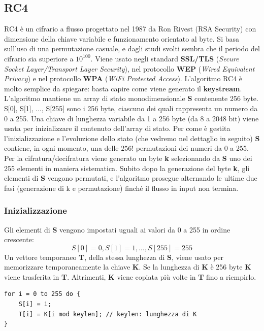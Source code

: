\subsection{RC4}
RC4 è un cifrario a flusso progettato nel 1987 da Ron Rivest (RSA Security) con dimensione della chiave variabile e funzionamento orientato al byte. Si basa sull'uso di una permutazione casuale, e dagli studi svolti sembra che il periodo del cifrario sia superiore a $10^{100}$. Viene usato negli standard \textbf{SSL/TLS} (\textit{Secure Socket Layer/Transport Layer Security}), nel protocollo \textbf{WEP} (\textit{Wired Equivalent Privacy}) e nel protocollo \textbf{WPA} (\textit{WiFi Protected Access}). L'algoritmo RC4 è molto semplice da spiegare: basta capire come viene generato il
\textbf{keystream}. \\

L'algoritmo mantiene un array di stato monodimensionale \textbf{S} contenente 256 byte. S[0], S[1], ..., S[255] sono i 256 byte, ciascuno dei quali rappresenta un numero da 0 a 255. Una chiave di lunghezza variabile da 1 a 256 byte (da 8 a 2048 bit) viene usata per inizializzare il contenuto dell'array di stato. Per come è gestita l'inizializzazione e l'evoluzione dello stato (che vedremo nel dettaglio in seguito) \textbf{S} contiene, in ogni momento, una delle $256!$ permutazioni dei numeri da 0 a 255. Per la cifratura/decifratura viene generato un byte \textbf{k} selezionando da \textbf{S} uno dei 255 elementi in maniera sistematica. Subito dopo la generazione del byte \textbf{k}, gli elementi di \textbf{S} vengono permutati, e l'algoritmo prosegue alternando le ultime due fasi (generazione di k e permutazione) finché il flusso in input non termina.\\

\subsubsection{Inizializzazione}
Gli elementi di \textbf{S} vengono impostati uguali ai valori da 0 a 255 in ordine crescente:
\[
S[0] = 0, S[1] = 1, ..., S[255] = 255
\]
Un vettore temporaneo \textbf{T}, della stessa lunghezza di \textbf{S}, viene usato per memorizzare temporaneamente la chiave \textbf{K}. Se la lunghezza di \textbf{K} è 256 byte \textbf{K} viene trasferita in \textbf{T}. Altrimenti, \textbf{K} viene copiata più volte in \textbf{T} fino a riempirlo.

\begin{algorithm}
\begin{lstlisting}[caption={Inizializzazione RC4}]
for i = 0 to 255 do {
	S[i] = i;
	T[i] = K[i mod keylen]; // keylen: lunghezza di K
}
\end{lstlisting}
\end{algorithm}

